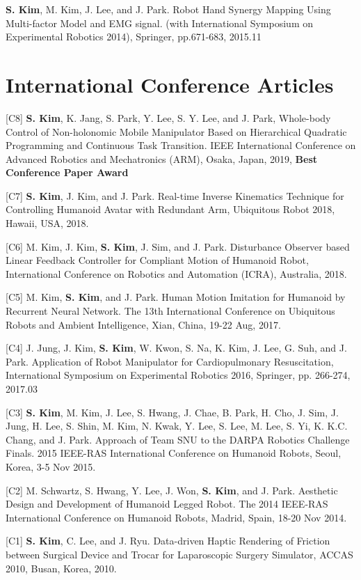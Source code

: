 \documentclass[margin,line]{res}
\begin{document}
\begin{resume}
[J1] \textbf{S. Kim}, M. Kim, J. Lee, and {J. Park}.
Robot Hand Synergy Mapping Using Multi-factor Model and EMG signal.
(with International Symposium on Experimental Robotics 2014), Springer, pp.671-683, 2015.11

\section{\sc International Conference Articles}
[C8] \textbf{S. Kim}, K. Jang, S. Park, Y. Lee, S. Y. Lee, and J. Park, Whole-body Control of Non-holonomic Mobile Manipulator Based on Hierarchical Quadratic Programming and Continuous Task Transition. IEEE International Conference on Advanced Robotics and Mechatronics (ARM), Osaka, Japan, 2019, \textbf{Best Conference Paper Award}

[C7] \textbf{S. Kim}, J. Kim, and J. Park.
Real-time Inverse Kinematics Technique for Controlling Humanoid Avatar with Redundant Arm,
Ubiquitous Robot 2018, Hawaii, USA, 2018.

[C6] M. Kim, J. Kim, \textbf{S. Kim}, J. Sim, and J. Park.
Disturbance Observer based Linear Feedback Controller for Compliant Motion of Humanoid Robot,
International Conference on Robotics and Automation (ICRA), Australia, 2018.

[C5] M. Kim, \textbf{S. Kim}, and {J. Park}.
Human Motion Imitation for Humanoid by Recurrent Neural Network.
The 13th International Conference on Ubiquitous Robots and Ambient Intelligence,
Xian, China, 19-22 Aug, 2017.


[C4] J. Jung, J. Kim, \textbf{S. Kim}, W. Kwon, S. Na, K. Kim, J. Lee, G. Suh, and J. Park.
Application of Robot Manipulator for Cardiopulmonary Resuscitation,  International Symposium on Experimental Robotics 2016, Springer, pp. 266-274, 2017.03

[C3] \textbf{S. Kim}, M. Kim, J. Lee, S. Hwang, J. Chae, B. Park, H. Cho, J. Sim, J. Jung, H. Lee, S. Shin, M. Kim, N. Kwak, Y. Lee, S. Lee, M. Lee, S. Yi, K. K.C. Chang, and {J. Park}.
Approach of Team SNU to the DARPA Robotics Challenge Finals.
2015 IEEE-RAS International Conference on Humanoid Robots,
Seoul, Korea, 3-5 Nov 2015.

[C2] M. Schwartz, S. Hwang, Y. Lee, J. Won, \textbf{S. Kim}, and {J. Park}.
Aesthetic Design and Development of Humanoid Legged Robot.
The 2014 IEEE-RAS International Conference on Humanoid Robots,
Madrid, Spain, 18-20 Nov 2014.

[C1] \textbf{S. Kim}, C. Lee, and J. Ryu.
Data-driven Haptic Rendering of Friction between Surgical Device and Trocar for Laparoscopic Surgery Simulator,
ACCAS 2010, Busan, Korea, 2010.


\end{resume}
\end{document}
